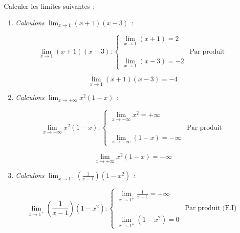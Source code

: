 \documentclass[12pt,a4paper]{article}
\begin{document}
Calculer les limites suivantes :
\begin{enumerate}
    \item \textit{Calculons $\displaystyle \lim_{x \to 1} (x + 1)(x - 3)$ :}
    
    \vspace{0.2cm}
    
    \[
    \lim_{x \to 1} (x + 1)(x - 3) :
    \begin{cases}
    \displaystyle \lim_{x \to 1} (x + 1) = 2 \\
    & \text{Par produit} \\
    \displaystyle \lim_{x \to 1} (x - 3) = -2
    \end{cases}
    \]
    
    \[
    \boxed{\lim_{x \to 1} (x + 1)(x - 3) = -4}
    \]

    \vspace{0.4cm}

    \item \textit{Calculons $\displaystyle \lim_{x \to +\infty} x^2(1 - x)$ :}
    
    \vspace{0.2cm}
    
    \[
    \lim_{x \to +\infty} x^2(1 - x) :
    \begin{cases}
    \displaystyle \lim_{x \to +\infty} x^2 = +\infty \\
    & \text{Par produit} \\
    \displaystyle \lim_{x \to +\infty} (1 - x) = -\infty
    \end{cases}
    \]
    
    \[
    \boxed{\lim_{x \to +\infty} x^2(1 - x) = -\infty}
    \]

    \vspace{0.4cm}

    \item \textit{Calculons $\displaystyle \lim_{x \to 1^+} \left(\frac{1}{x - 1}\right)(1 - x^2)$ :}
    
    \vspace{0.2cm}
    
    \[
    \lim_{x \to 1^+} \left(\frac{1}{x - 1}\right)(1 - x^2) :
    \begin{cases}
    \displaystyle \lim_{x \to 1^+} \frac{1}{x - 1} = +\infty \\
    & \text{Par produit (F.I)} \\
    \displaystyle \lim_{x \to 1^+} (1 - x^2) = 0
    \end{cases}
    \]
    

\end{enumerate}
\end{document}
